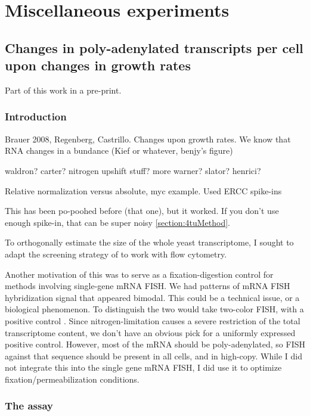 \chapter{Miscellaneous experiments}

%
%
%
\section{Changes in poly-adenylated transcripts per cell upon changes
in growth rates}
%
%
%

Part of this work in a pre-print.

%
%
%
\subsection{Introduction}
%
%
%

Brauer 2008, Regenberg, Castrillo.
Changes upon growth rates.
We know that RNA changes in a bundance (Kief or whatever, benjy's
figure)

waldron?
carter?
nitrogen upshift stuff?
more warner?
slator?
henrici?

Relative normalization versus absolute,
myc example.
Used ERCC spike-ins 

This has been po-poohed before (that one), but it worked.
If you don't use enough spike-in, that can be super noisy
\autoref{section:4tuMethod}.

To orthogonally estimate the size of the whole yeast transcriptome,
I sought to adapt the screening strategy of \cite{amberg1992???}
to work with flow cytometry. 

Another motivation of this was to serve as a fixation-digestion
control for methods involving single-gene mRNA FISH.
We had patterns of mRNA FISH hybridization signal that appeared
bimodal. This could be a technical issue, or a biological phenomenon.
To distinguish the two would take two-color FISH, with a positive
control \parencite{regenbergtwocolor???}.
Since nitrogen-limitation causes a severe restriction of the total
transcriptome content, we don't have an obvious pick for a uniformly
expressed positive control. 
However, most of the mRNA should be poly-adenylated, so FISH against
that sequence should be present in all cells, and in high-copy.
While I did not integrate this into the single gene mRNA FISH, I did
use it to optimize fixation/permeabilization conditions.

%
%
%
\subsection{The assay}
%
%
%

